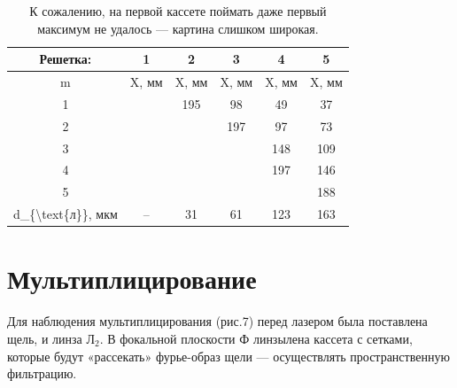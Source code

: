 \documentclass[a4paper, 14pt]{extarticle}%
\newcommand\ECaption[1]{%
     \captionsetup{font=footnotesize}%
     \caption{#1}}
\begin{document}
\begin{table}[h!]
\begin{center}
\begin{tabular}{|c|c|c|c|c|c|}
\hline
\rowcolor[HTML]{00D2CB} 
Решетка:                              & 1                        & 2                        & 3                        & 4                        & 5     \\ \hline
\rowcolor[HTML]{9698ED} 
m                                     & X, мм                    & X, мм                    & X, мм                    & X, мм                    & X, мм \\ \hline
1                                     & \cellcolor[HTML]{DAE8FC} & 195                      & 98                       & 49                       & 37    \\ \hline
\rowcolor[HTML]{9698ED} 
2                                     & \cellcolor[HTML]{DAE8FC} & \cellcolor[HTML]{DAE8FC} & 197                      & 97                       & 73    \\ \hline
3                                     & \cellcolor[HTML]{DAE8FC} & \cellcolor[HTML]{DAE8FC} & \cellcolor[HTML]{DAE8FC} & 148                      & 109   \\ \hline
\rowcolor[HTML]{9698ED} 
4                                     & \cellcolor[HTML]{DAE8FC} & \cellcolor[HTML]{DAE8FC} & \cellcolor[HTML]{DAE8FC} & 197                      & 146   \\ \hline
5                                     & \cellcolor[HTML]{DAE8FC} & \cellcolor[HTML]{DAE8FC} & \cellcolor[HTML]{DAE8FC} & \cellcolor[HTML]{DAE8FC} & 188   \\ \hline
\rowcolor[HTML]{00D2CB} 
d\_\{\textbackslash{}text\{л\}\}, мкм & --                       & 31                       & 61                       & 123                      & 163   \\ \hline
\end{tabular}
\ECaption{К сожалению, на первой кассете поймать даже первый максимум не удалось --- картина слишком широкая.}
\end{center}
\end{table}

\section*{Мультиплицирование}

Для наблюдения мультиплицирования (рис.7) перед лазером была поставлена щель, и линза Л$_2$. В фокальной плоскости
Ф линзылена
кассета с сетками,
которые будут «рассекать» фурье-образ щели
— осуществлять пространственную фильтрацию.
\end{document}

